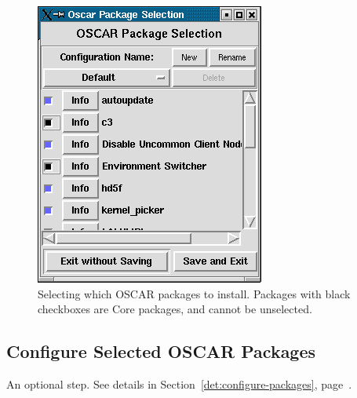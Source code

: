 \begin{figure}[ht!]
  \begin{center}
    \centerline{\includegraphics[scale=\imgscale]{figs/package-selection}}
    \caption[Selecting which OSCAR packages to install.]{Selecting
      which OSCAR packages to install.  Packages with black checkboxes
      are Core packages, and cannot be unselected.}
    \label{fig:sbs-package-selection}
  \end{center}
\end{figure}


\subsection{Configure Selected OSCAR Packages}

An optional step.  See details in
Section~\ref{det:configure-packages},
page~\pageref{det:configure-packages}.

